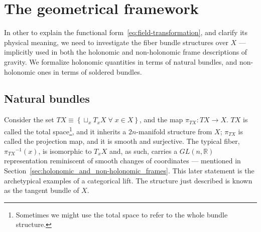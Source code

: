 \documentclass[../../main.tex]{subfiles}
\begin{document}
\section{The geometrical framework}\label{sec:geometric_picture}

In other to explain the functional form~\eqref{eq:field-transformation}, and clarify its physical meaning, we need to investigate the fiber bundle structures over $X$ --- implicitly used in both the holonomic and non-holonomic frame descriptions of gravity. We formalize holonomic quantities in terms of natural bundles, and non-holonomic ones in terms of soldered bundles.

\subsection{Natural bundles}\label{ssec:natural_bundles}

Consider the set $TX \equiv \left\{ \sqcup_x T_x X \; \forall \; x\in X \right\}$, and the map $\pi_{TX}: TX \rightarrow X$. $TX$ is called the total space\footnote{Sometimes we might use the total space to refer to the whole bundle structure.}, and it inherits a $2n$-manifold structure from $X$; $\pi_{TX}$ is called the projection map, and it is smooth and surjective. The typical fiber, $ { \pi_{TX} }^{-1} \left( x \right) $, is isomorphic to $ T_x X $ and, as such, carries a $ GL \left( n, \mathbb{R} \right)$ representation reminiscent of smooth changes of coordinates --- mentioned in Section~\ref{sec:holonomic_and_non-holonomic_frames}. This later statement is the archetypical examples of a categorical lift. The structure just described is known as the tangent bundle of $X$.
\end{document}
